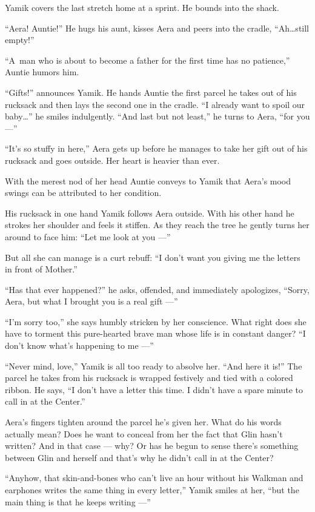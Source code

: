 \documentclass[twoside,11pt,openany]{book}
\begin{document}
Yamik covers the last stretch home at a sprint. He bounds into the shack.

``Aera! Auntie!'' He hugs his aunt, kisses Aera and peers into the cradle,
``Ah{\ldots}still empty!''

``A~man who is about to become a father for the first time has no patience,'' Auntie humors
him.

``Gifts!'' announces Yamik. He hands Auntie the first parcel he takes out of his rucksack and
then lays the second one in the cradle. ``I already want to spoil our baby{\ldots}'' he smiles indulgently.
``And last but not least,'' he turns to Aera, ``for you ---''

``It's so stuffy in here,'' Aera gets up before he manages to take her gift out of his
rucksack and goes outside. Her heart is heavier than ever.

With the merest nod of her head Auntie conveys to Yamik that Aera's
mood swings can be attributed to her condition.

His rucksack in one hand Yamik follows Aera outside. With his other hand he strokes her shoulder and feels it stiffen.
As they reach the tree he gently turns her around to face him: ``Let me look at you ---''

But all she can manage is a curt rebuff:   ``I don't want you giving me the letters in front of
Mother.''

``Has that ever happened?'' he asks, offended, and immediately apologizes,
``Sorry, Aera, but what I brought you is a real gift ---''

``I'm sorry too,'' she says humbly stricken by her conscience. What right does she have to
torment this pure-hearted brave man whose life is in constant danger? ``I don't know what's happening to
me ---''

``Never mind, love,'' Yamik is all too ready to absolve her. ``And here it
is!'' The parcel he takes from his rucksack is wrapped festively and tied with a colored ribbon. He says,
``I don't have a letter this time. I didn't have a spare minute to call in at the Center.''

Aera's fingers tighten around the parcel he's given her. What do his words actually mean? Does he want to conceal from
her the fact that Glin hasn't written? And in that case --- why? Or has he begun to sense there's something between Glin
and herself and that's why he didn't call in at the Center?

``Anyhow, that skin-and-bones who can't live an hour without his Walkman and earphones writes the same
thing in every letter,'' Yamik smiles at her, ``but the main thing is that he
 keeps  writing ---''
\end{document}
